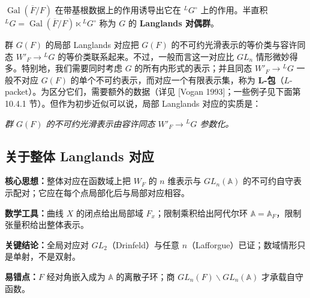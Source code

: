 $\operatorname{Gal}(\overline{F}/F)$ 在带基根数据上的作用诱导出它在 ${}^L G^\circ$ 上的作用。半直积 ${}^L G=\operatorname{Gal}(\overline{F}/F)\ltimes{}^L G^\circ$ 称为 $G$ 的 \textbf{Langlands 对偶群}。


群 $G(F)$ 的局部 Langlands 对应把 $G(F)$ 的不可约光滑表示的等价类与容许同态 $W'_F\to{}^L G$ 的等价类联系起来。不过，一般而言这一对应比 $GL_n$ 情形微妙得多。特别地，我们需要同时考虑 $G$ 的所有内形式的表示；并且同态 $W'_F\to{}^L G$ 一般不对应 $G(F)$ 的单个不可约表示，而对应一个有限表示集，称为 \textbf{L-包}（$L$-packet）。为区分它们，需要额外的数据（详见 [Vogan 1993]；一些例子见下面第 10.4.1 节）。但作为初步近似可以说，局部 Langlands 对应的实质是：
\begin{center}
\itshape 群 $G(F)$ 的不可约光滑表示由容许同态 $W'_F\to{}^L G$ 参数化。
\end{center}


\subsection{关于整体 Langlands 对应}

\begin{keypoints}
    \item \textbf{核心思想：}整体对应在函数域上把 $W_F$ 的 $n$ 维表示与 $GL_n(\mathbb{A})$ 的不可约自守表示配对；它应在每个点局部化后与局部对应相容。
    \item \textbf{数学工具：}曲线 $X$ 的闭点给出局部域 $F_x$；限制乘积给出阿代尔环 $\mathbb{A}=\mathbb{A}_F$，限制张量积给出整体表示。
    \item \textbf{关键结论：}全局对应对 $GL_2$（Drinfeld）与任意 $n$（Lafforgue）已证；数域情形只是单射，不是双射。
    \item \textbf{易错点：}$F$ 经对角嵌入成为 $\mathbb{A}$ 的离散子环；商 $GL_n(F)\backslash GL_n(\mathbb{A})$ 才承载自守函数。
\end{keypoints}

